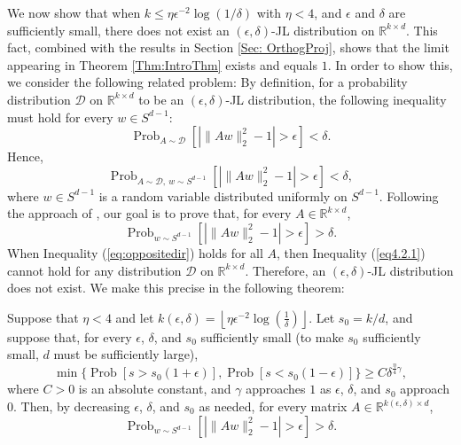 \documentclass[twoside,11pt]{article}
\newcommand{\D}{\mathcal{D}}
\newcommand{\R}{{\mathbb R}}
\newcommand{\pP}[1]{\operatorname{Prob}\left[ #1 \right] }
\newcommand{\pPP}[2]{\operatorname{Prob}_{#2} \left[ #1 \right] }
\begin{document}
We now show that when $k\leq\eta\epsilon^{-2}\log(1/\delta)$ with $\eta<4$, and $\epsilon$ and $\delta$ are sufficiently small, there does not exist an $(\epsilon, \delta)$-JL distribution on  $\R^{k\times d}$.
This fact, combined with the results in Section \ref{Sec: OrthogProj}, shows that the limit 
appearing in Theorem \ref{Thm:IntroThm} exists and equals $1$.  
In order to show this, we consider the following related problem:
By definition, for a probability
distribution $\D$ on  $\R^{k\times d}$
to be an  $(\epsilon, \delta)$-JL distribution, the following inequality must hold for every $w \in S^{d-1}$:
\[	\pPP{|\|Aw\|_2^2 -1| > \epsilon }{A \sim \D} < \delta.\]
Hence,
\begin{equation}\label{eq4.2.1}
\pPP{|\|Aw\|_2^2 -1| > \epsilon }{A \sim \D, \  w \sim S^{d-1}} < \delta,
\end{equation}
where $w \in S^{d-1}$ is a random variable distributed uniformly on $S^{d-1}$.  Following the approach of \cite{KaneNelsonMeka}, our goal is to prove that, for every $A \in \R^{k \times d}$, 
\begin{equation}\label{eq:oppositedir}
\pPP{|\|Aw\|_2^2 -1| > \epsilon }{w \sim S^{d-1}} > \delta.
\end{equation}
When Inequality (\ref{eq:oppositedir}) holds for all $A$, then Inequality (\ref{eq4.2.1}) cannot hold for any distribution $\D$ on $\R^{k \times d}$.  Therefore, an $(\epsilon, \delta)$-JL distribution does not exist.  We make this precise in the following theorem:

\begin{theorem} \label{thm_lowbound}
Suppose that $\eta<4$ and let $k(\epsilon,\delta)=\left\lfloor\eta\epsilon^{-2} \log \left(  \frac{1}{\delta}  \right)\right\rfloor$.
Let $s_0=k/d$, and suppose that, for every $\epsilon$, $\delta$, and $s_0$ sufficiently small (to make $s_0$ sufficiently small, $d$ must be sufficiently large),
\[    \min\{\pP{s>s_0(1+\epsilon)},\pP{s<s_0(1-\epsilon)}\} \geq C\delta^{\frac{\eta}{4}\gamma},\]
where $C>0$ is an absolute constant, and $\gamma$ approaches $1$ as $\epsilon$, $\delta$, and $s_0$ approach $0$.
Then, by decreasing $\epsilon$, $\delta$, and $s_0$ as needed, for every matrix   $A \in \R^{k(\epsilon,\delta) \times d}$, 
				\[\pPP{\left|\|Aw\|^2_2-1\right|> \epsilon}{w \sim S^{d-1}} > \delta.\]
\end{theorem}
\end{document}
